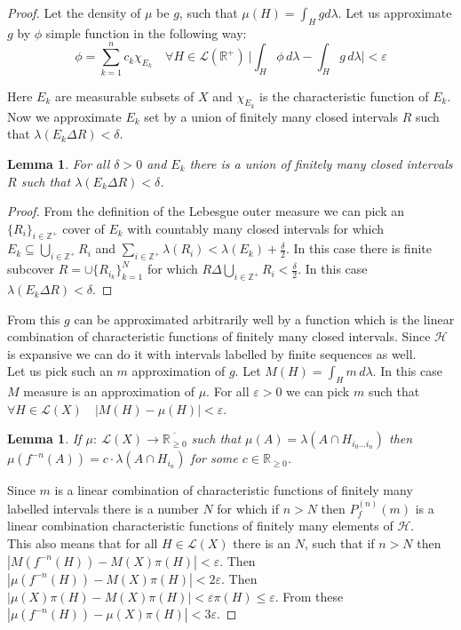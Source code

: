 \documentclass{article}
\newtheorem{lemma}[theorem]{Lemma}
\begin{document}
\begin{proof}
Let the density of $\mu$ be $g$, such that $\mu(H)=\int_H g d\lambda$. Let us approximate $g$ by $\phi$ simple function in the following way: \[
\phi = \sum_{k=1}^n c_k \chi_{E_k} \quad
\forall H \in \mathscr{L}( \mathbb{R^+} ) \: \bigg| \int_H \phi \, d\lambda - \int_H g \, d\lambda \bigg| < \varepsilon
\]

Here $E_k$ are measurable subsets of $X$ and $\chi_{E_k}$ is the characteristic function of $E_k$. Now we approximate $E_k$ set by a union of finitely many closed intervals $R$ such that $\lambda(E_k \Delta R) < \delta$. 

\begin{lemma}
For all $\delta > 0$ and $E_k$ there is a union of finitely many closed intervals $R$ such that $\lambda(E_k \Delta R) < \delta$.
\end{lemma}
\begin{proof}
From the definition of the Lebesgue outer measure we can pick an $\{R_i\}_{i\in \mathbb{Z^+}}$ cover of $E_k$ with countably many closed intervals for which $E_k \subseteq \bigcup_{i\in \mathbb{Z^+}} R_i$ and $\sum_{i\in \mathbb{Z^+}} \lambda(R_i) < \lambda(E_k) + \frac{\delta}{2}$. In this case there is finite subcover $R = \cup \{R_{i_k}\}_{k = 1}^N$ for which $R \Delta \bigcup_{i\in \mathbb{Z^+}} R_i < \frac{\delta}{2}$. In this case $\lambda(E_k \Delta R) < \delta$.
\end{proof}

From this $g$ can be approximated arbitrarily well by a function which is the linear combination of characteristic functions of finitely many closed intervals. Since $\mathscr{H}$ is expansive we can do it with intervals labelled by finite sequences as well.\\

Let us pick such an $m$ approximation of $g$. Let $M(H) = \int_H m\,d\lambda$. In this case $M$ measure is an approximation of $\mu$. For all $\varepsilon > 0$ we can pick $m$ such that $\forall H \in \mathscr{L}(X) \quad | M(H) - \mu(H) | < \varepsilon$.

\begin{lemma} \label{push}
If $\mu:\: \mathscr{L}(X) \rightarrow \overline{\mathbb{R}_{\geq 0}}$ such that $\mu(A) = \lambda(A \cap H_{i_0...i_n})$ then $\mu(f^{-n}(A)) = c \cdot \lambda(A \cap H_{i_n})$ for some $c \in \mathbb{R}_{\geq 0}$.
\end{lemma}

Since $m$ is a linear combination of characteristic functions of finitely many labelled intervals there is a number $N$ for which if $n>N$ then $P_f^{(n)}(m)$ is a linear combination characteristic functions of finitely many elements of $\mathscr{H}$.\\

This also means that for all $H \in \mathscr{L}(X)$ there is an $N$, such that if $n>N$ then $|M(f^{-n}(H)) - M(X) \pi(H)| < \varepsilon$. Then $|\mu(f^{-n}(H)) - M(X) \pi(H)| < 2\varepsilon$. Then $|\mu(X)\pi(H) - M(X) \pi(H)| < \varepsilon \pi(H) \leq \varepsilon$. From these $|\mu(f^{-n}(H)) - \mu(X) \pi(H)| < 3\varepsilon$.
\end{proof}
\end{document}
